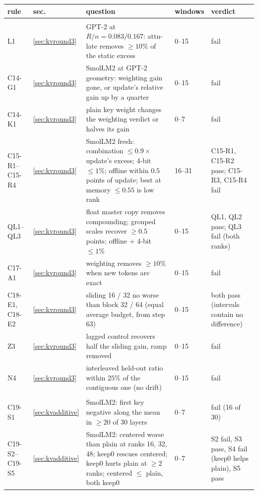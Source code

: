 \documentclass[10pt]{article}
\theoremstyle{plain}
\theoremstyle{definition}
\theoremstyle{remark}
\newcommand{\rl}[1]{\textsf{#1}}%
\begin{document}
\begin{table}[p]
\centering\footnotesize
\begin{tabularx}{\textwidth}{@{}>{\raggedright}p{2.4cm} >{\raggedright}p{0.7cm} >{\raggedright}X >{\raggedright}p{1.4cm} >{\raggedright\arraybackslash}p{4.0cm}@{}}
\toprule
\textbf{rule} & \textbf{sec.} & \textbf{question} & \textbf{windows} & \textbf{verdict}\\
\midrule
\multicolumn{5}{@{}l}{\emph{Round 3 (C14--C18), Section~\ref{sec:kvround3}}}\\
\rl{L1} & \ref{sec:kvround3} & GPT-2 at $R/n=0.083/0.167$: attn-late removes $\ge10\%$ of the static excess & 0--15 & fail\\
\rl{C14-G1} & \ref{sec:kvround3} & SmolLM2 at GPT-2 geometry: weighting gain gone, or update's relative gain up by a quarter & 0--15 & fail\\
\rl{C14-K1} & \ref{sec:kvround3} & plain key weight changes the weighting verdict or halves its gain & 0--7 & fail\\
\rl{C15-R1}--\rl{C15-R4} & \ref{sec:kvround3} & SmolLM2 fresh: combination $\le0.9\times$ update's excess; 4-bit $\le1\%$; offline within $0.5$ points of update; best at memory $\le0.55$ is low rank & 16--31 & \rl{C15-R1}, \rl{C15-R2} pass; \rl{C15-R3}, \rl{C15-R4} fail\\
\rl{QL1}--\rl{QL3} & \ref{sec:kvround3} & float master copy removes compounding; grouped scales recover $\ge0.5$ points; offline + 4-bit $\le1\%$ & 0--15 & \rl{QL1}, \rl{QL2} pass; \rl{QL3} fail (both ranks)\\
\rl{C17-A1} & \ref{sec:kvround3} & weighting removes $\ge10\%$ when new tokens are exact & 0--15 & fail\\
\rl{C18-E1}, \rl{C18-E2} & \ref{sec:kvround3} & sliding 16 / 32 no worse than block 32 / 64 (equal average budget, from step 63) & 0--15 & both pass (intervals contain no difference)\\
\rl{Z3} & \ref{sec:kvround3} & lagged control recovers half the sliding gain, ramp removed & 0--15 & fail\\
\rl{N4} & \ref{sec:kvround3} & interleaved held-out ratio within $25\%$ of the contiguous one (no drift) & 0--15 & fail\\
\multicolumn{5}{@{}l}{\emph{Round 4 (C19--C23), Section~\ref{sec:kvadditive}}}\\
\rl{C19-S1} & \ref{sec:kvadditive} & SmolLM2: first key negative along the mean in $\ge20$ of 30 layers & 0--7 & fail (16 of 30)\\
\rl{C19-S2}--\rl{C19-S5} & \ref{sec:kvadditive} & SmolLM2: centered worse than plain at ranks 16, 32, 48; keep0 rescues centered; keep0 hurts plain at $\ge2$ ranks; centered $\le$ plain, both keep0 & 0--7 & S2 fail, S3 pass, S4 fail (keep0 helps plain), S5 pass\\

\end{tabularx}
\end{table}
\end{document}
